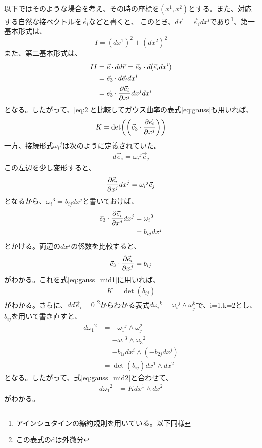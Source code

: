 \documentclass[uplatex,dvipdfmx]{jsarticle}
\begin{document}
以下ではそのような場合を考え、その時の座標を$(x^1, x^2)$とする。また、対応する自然な接ベクトルを$\vec{e}_i$などと書くと、
このとき、$d\vec{r}=\vec{e}_i dx^i$であり\footnote{アインシュタインの縮約規則を用いている。以下同様}、第一基本形式は、
\begin{equation}
    I = (dx^1)^2 + (dx^2)^2    
\end{equation}
また、第二基本形式は、
\begin{align}
    II &= \vec{e} \cdot dd\vec{r} = \vec{e}_3\cdot d(\vec{e}_i dx^i) \\
        &= \vec{e}_3 \cdot d\vec{e}_i dx^i \\
        &= \vec{e}_3 \cdot \frac{\partial \vec{e}_i}{\partial x^j} dx^j dx^i 
\end{align}
となる。したがって、\ref{eq:2}と比較してガウス曲率の表式\ref{eq:gauss}も用いれば、
\begin{align}
    K = \det(\left ( \vec{e}_3 \cdot \frac{\partial \vec{e}_i}{\partial x^j} \right )  ) \label{eq:gauss_mid1}
\end{align}
一方、接続形式${\omega_i}^j$は次のように定義されていた。
\begin{align}
    d\vec{e}_i = {\omega_i}^j \vec{e}_j    
\end{align}
この左辺を少し変形すると、
\begin{align}
    \frac{\partial \vec{e}_i}{\partial x^j} dx^j = {\omega_i}^j \vec{e}_j
\end{align}
となるから、${\omega_i}^3 = b_{ij}dx^j$と書いておけば、
\begin{align}
    \vec{e}_3 \cdot \frac{\partial \vec{e}_i}{\partial x^j} dx^j &= {\omega_i}^3 \\
    &= b_{ij}dx^j
\end{align}
とかける。両辺の$dx^j$の係数を比較すると、
\begin{align}
    \vec{e}_3 \cdot \frac{\partial \vec{e}_i}{\partial x^j} = b_{ij}
\end{align}
がわかる。これを式\ref{eq:gauss_mid1}に用いれば、
\begin{align}
    K = \det(b_{ij}) \label{eq:gauss_mid2}
\end{align}
がわかる。さらに、$dd\vec{e}_i = 0$ \footnote{この表式のdは外微分}からわかる表式$d{\omega_i}^k = {\omega_i}^j \wedge \omega_j^k$で、i=1,k=2とし、$b_{ij}$を用いて書き直すと、
\begin{align}
    d{\omega_1}^2 &= - {\omega_1}^j \wedge \omega_j^2 \\
     &= - {\omega_1}^3 \wedge {\omega_3}^2 \\
     &= -b_{1i} dx^i \wedge (-b_{2j} dx^j) \\
     &= \det(b_{ij}) dx^1 \wedge dx^2
\end{align}
となる。したがって、式\ref{eq:gauss_mid2}と合わせて、
\begin{align}
    d{\omega_1}^2 &= K dx^1 \wedge dx^2
\end{align}
がわかる。
\end{document}
